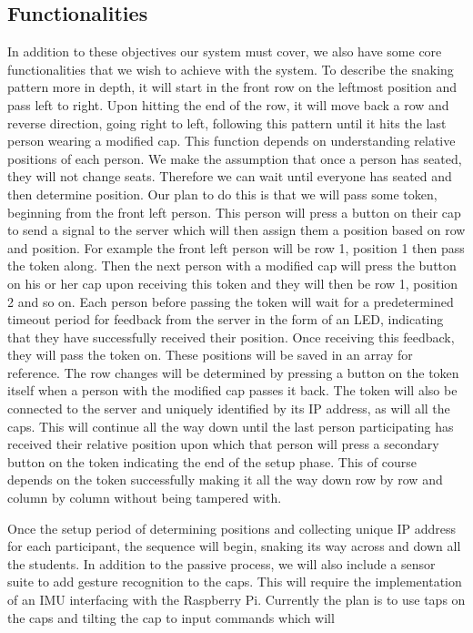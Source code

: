\documentclass[12pt,letterpaper]{article}
\begin{document}
    \subsection{Functionalities}
    In addition to these objectives our system must cover, we also have some core functionalities that we wish to achieve with the system. To describe the snaking pattern more in depth, it will start in the front row on the leftmost position and pass left to right. Upon hitting the end of the row, it will move back a row and reverse direction, going right to left, following this pattern until it hits the last person wearing a modified cap. This function depends on understanding relative positions of each person. We make the assumption that once a person has seated, they will not change seats. Therefore we can wait until everyone has seated and then determine position. Our plan to do this is that we will pass some token, beginning from the front left person. This person will press a button on their cap to send a signal to the server which will then assign them a position based on row and position. For example the front left person will be row 1, position 1 then pass the token along. Then the next person with a modified cap will press the button on his or her cap upon receiving this token and they will then be row 1, position 2 and so on. Each person before passing the token will wait for a predetermined timeout period for feedback from the server in the form of an LED, indicating that they have successfully received their position. Once receiving this feedback, they will pass the token on. These positions will be saved in an array for reference. The row changes will be determined by pressing a button on the token itself when a person with the modified cap passes it back. The token will also be connected to the server and uniquely identified by its IP address, as will all the caps. This will continue all the way down until the last person participating has received their relative position upon which that person will press a secondary button on the token indicating the end of the setup phase. This of course depends on the token successfully making it all the way down row by row and column by column without being tampered with. 

    Once the setup period of determining positions and collecting unique IP address for each participant, the sequence will begin, snaking its way across and down all the students. In addition to the passive process, we will also include a sensor suite to add gesture recognition to the caps. This will require the implementation of an IMU interfacing with the Raspberry Pi. Currently the plan is to use taps on the caps and tilting the cap to input commands which will 
\end{document}
